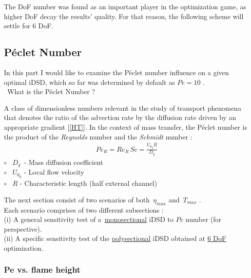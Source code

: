 \documentclass[12pt]{article}
\numberwithin{equation}{section}
\begin{document}
\begin{flushleft}
The DoF number was found as an important player in the optimization game, as higher DoF decay the results' quality. For that reason, the following scheme will settle for 6 DoF.
 
\subsection{Péclet Number}
In this part I would like to examine the Péclet number influence on a given optimal iDSD, which so far was determined by default as $Pe = 10$ . \\ \vspace{3mm}
\hspace{12mm} \ What is the Péclet Number ?

A class of dimensionless numbers relevant in the study of transport phenomena that denotes the ratio of the advection rate by the diffusion rate driven by an appropriate gradient  [\ref{HT}]. In the context of mass transfer, the Péclet number is the product of the \textit{Reynolds} number and the \textit{Schmidt} number :
\begin{align*}
Pe_R = Re_R \, Sc = \frac{U_{0_g} R}{D_g}
\end{align*}
\hspace{15mm} $\circ$ \ $D_g$\, - Mass diffusion coefficient \\
\hspace{15mm} $\circ$ \ $U_{0_g}$ - Local flow velocity \\
\hspace{15mm} $\circ$ \ $R$ \hspace{1.6mm} - Characteristic length (half external channel)

The next section consist of two scenarios of both \,$\eta_{max}$ and \,$T_{max}$ . \\ Each scenario comprises of two different subsections : \\
(i) \hspace{0.2mm} A general sensitivity test of a\, \underline{monosectional} iDSD to $Pe$ number (for perspective). \\
(ii) A specific sensitivity test of the \underline{polysectional} iDSD obtained at \hyperref[T_d_6]{6 DoF} optimization.



\subsubsection{Pe vs. flame height}


\end{flushleft}
\end{document}
